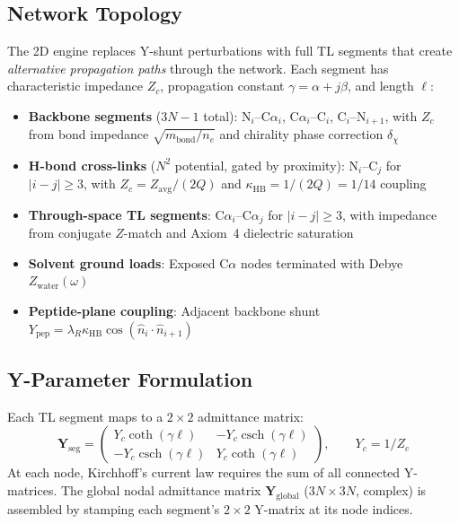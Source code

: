 \subsection{Network Topology}
\label{sec:network_topology}

The 2D engine replaces Y-shunt perturbations with full TL segments that create \emph{alternative propagation paths} through the network.
Each segment has characteristic impedance $Z_c$, propagation constant $\gamma = \alpha + j\beta$, and length $\ell$:

\begin{itemize}
    \item \textbf{Backbone segments} ($3N-1$ total): N$_i$--C$\alpha_i$, C$\alpha_i$--C$_i$, C$_i$--N$_{i+1}$, with $Z_c$ from bond impedance $\sqrt{m_\text{bond}/n_e}$ and chirality phase correction $\delta_\chi$
    \item \textbf{H-bond cross-links} ($N^2$ potential, gated by proximity): N$_i$--C$_j$ for $|i-j| \geq 3$, with $Z_c = Z_\text{avg}/(2Q)$ and $\kappa_\text{HB} = 1/(2Q) = 1/14$ coupling
    \item \textbf{Through-space TL segments}: C$\alpha_i$--C$\alpha_j$ for $|i-j| \geq 3$, with impedance from conjugate $Z$-match and Axiom~4 dielectric saturation
    \item \textbf{Solvent ground loads}: Exposed C$\alpha$ nodes terminated with Debye $Z_\text{water}(\omega)$
    \item \textbf{Peptide-plane coupling}: Adjacent backbone shunt $Y_\text{pep} = \lambda_R \kappa_\text{HB} \cos(\hat{n}_i \cdot \hat{n}_{i+1})$
\end{itemize}

\subsection{Y-Parameter Formulation}
\label{sec:y_param}

Each TL segment maps to a $2 \times 2$ admittance matrix:
\begin{equation}
    \mathbf{Y}_\text{seg} = \begin{pmatrix}
        Y_c \coth(\gamma\ell) & -Y_c \operatorname{csch}(\gamma\ell) \\
        -Y_c \operatorname{csch}(\gamma\ell) & Y_c \coth(\gamma\ell)
    \end{pmatrix}, \qquad Y_c = 1/Z_c
    \label{eq:y_matrix_tl}
\end{equation}
At each node, Kirchhoff's current law requires the sum of all connected Y-matrices.
The global nodal admittance matrix $\mathbf{Y}_\text{global}$ ($3N \times 3N$, complex) is assembled by stamping each segment's $2\times 2$ Y-matrix at its node indices.

